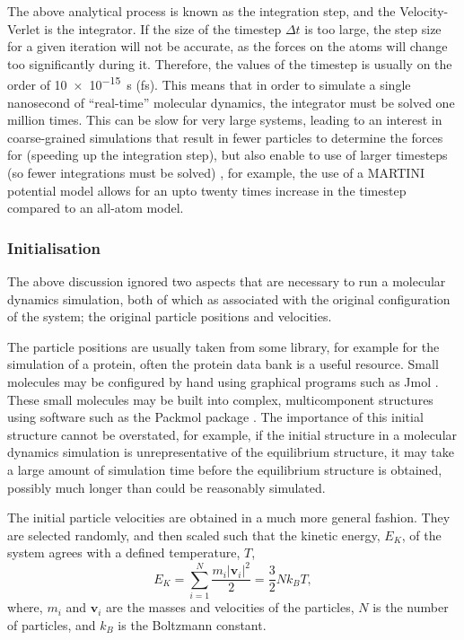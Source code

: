 The above analytical process is known as the integration step, and the Velocity-Verlet is the integrator.
If the size of the timestep $\Delta t$ is too large, the step size for a given iteration will not be accurate, as the forces on the atoms will change too significantly during it.
Therefore, the values of the timestep is usually on the order of \SI{10e-15}{\second} (\si{\femto\second}).
This means that in order to simulate a single nanosecond of ``real-time'' molecular dynamics, the integrator must be solved one million times.
This can be slow for very large systems, leading to an interest in coarse-grained simulations that result in fewer particles to determine the forces for (speeding up the integration step), but also enable to use of larger timesteps (so fewer integrations must be solved) \cite{rudd_coarse-grained_1998,brini_systematic_2013}, for example, the use of a MARTINI potential model allows for an upto twenty times increase in the timestep compared to an all-atom model.

\subsubsection{Initialisation}
The above discussion ignored two aspects that are necessary to run a molecular dynamics simulation, both of which as associated with the original configuration of the system; the original particle positions and velocities.

The particle positions are usually taken from some library, for example for the simulation of a protein, often the protein data bank \cite{noauthor_rcsb_nodate} is a useful resource.
Small molecules may be configured by hand using graphical programs such as Jmol \cite{noauthor_jmol_nodate}.
These small molecules may be built into complex, multicomponent structures using software such as the Packmol package \cite{martinez_packmol_2009}.
The importance of this initial structure cannot be overstated, for example, if the initial structure in a molecular dynamics simulation is unrepresentative of the equilibrium structure, it may take a large amount of simulation time before the equilibrium structure is obtained, possibly much longer than could be reasonably simulated.

The initial particle velocities are obtained in a much more general fashion.
They are selected randomly, and then scaled such that the kinetic energy, $E_K$, of the system agrees with a defined temperature, $T$,
%
\begin{equation}
E_K = \sum_{i=1}^N{\frac{m_i|\mathbf{v}_i|^2}{2}} = \frac{3}{2}Nk_BT,
\label{equ:ek}
\end{equation}
%
where, $m_i$ and $\mathbf{v}_i$ are the masses and velocities of the particles, $N$ is the number of particles, and $k_B$ is the Boltzmann constant.

